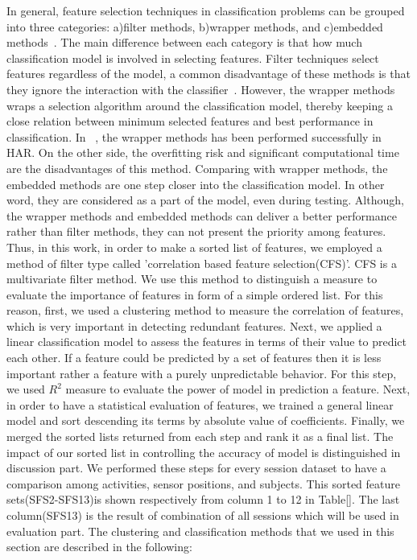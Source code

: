 In general, feature selection techniques in classification problems can be grouped into three categories: a)filter methods, b)wrapper methods, and c)embedded methods~\cite{saeys2007review}. The main difference between each category is that how much classification model is involved in selecting features. Filter techniques select features regardless of the model, a common disadvantage of these methods is that they ignore the interaction with the classifier~\cite{saeys2007review}. However, the wrapper methods wraps a selection algorithm around the classification model, thereby keeping a close relation between minimum selected features and best performance in classification. In ~\cite{zhang2011feature}, the wrapper methods has been performed successfully in HAR. On the other side, the overfitting risk and significant computational time are the disadvantages of this method. Comparing with wrapper methods, the embedded methods are one step closer into the classification model. In other word, they are considered as a part of the model, even during testing. Although, the wrapper methods and embedded methods can deliver a better performance rather than filter methods, they can not present the priority among features. Thus, in this work, in order to make a sorted list of features, we employed a method of filter type called 'correlation based feature selection(CFS)'. CFS is a multivariate filter method. We use this method to distinguish a measure to evaluate the importance of features in form of a simple ordered list. For this reason, first, we used a clustering method to measure the correlation of features, which is very important in detecting redundant features. Next, we applied a linear classification model to assess the features in terms of their value to predict each other. If a feature could be predicted by a set of features then it is less important rather a feature with a purely unpredictable behavior. For this step, we used $R^{2}$ measure to evaluate the power of model in prediction a feature. Next, in order to have a statistical evaluation of features, we trained a general linear model and sort descending its terms by absolute value of coefficients. Finally, we merged the sorted lists returned from each step and rank it as a final list. The impact of our sorted list in controlling the accuracy of model is distinguished in discussion part. We performed these steps for every session dataset to have a comparison among activities, sensor positions, and subjects. This sorted feature sets(SFS2-SFS13)is shown respectively from column 1 to 12 in Table[]. The last column(SFS13) is the result of combination of all sessions which will be used in evaluation part. The clustering and classification methods that we used in this section are described in the following:

